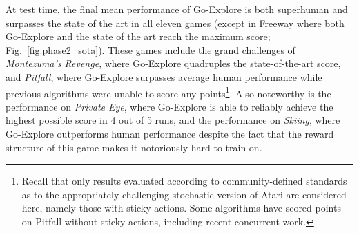 \documentclass{nature}
\renewcommand*{\cite}[1]{\supercite{#1}}
\begin{document}
At test time, the final mean performance of Go-Explore is both superhuman and surpasses the state of the art in all eleven games (except in Freeway where both Go-Explore and the state of the art reach the maximum score; Fig.~\ref{fig:phase2_sota}).
These games include the grand challenges of \emph{Montezuma's Revenge}, where Go-Explore quadruples the state-of-the-art score, and \emph{Pitfall}, where Go-Explore surpasses average human performance while previous algorithms were unable to score any points\footnote{
Recall that only results evaluated according to community-defined standards as to the appropriately challenging stochastic version of Atari are considered here, namely those with sticky actions\cite{Machado2018RevisitingTA}. Some algorithms have scored points on Pitfall without sticky actions, including recent concurrent work\cite{badia2020agent57,puigdomenech2020never}.}. Also noteworthy is the performance on \emph{Private Eye}, where Go-Explore is able to reliably achieve the highest possible score in 4 out of 5 runs, and the performance on \emph{Skiing}, where Go-Explore outperforms human performance despite the fact that the reward structure of this game makes it notoriously hard to train on\cite{such2017deep,badia2020agent57}.
\end{document}
